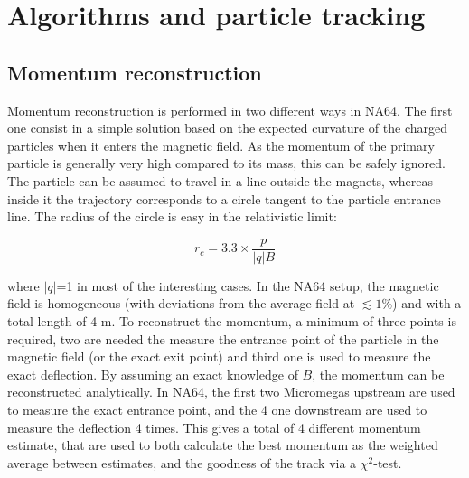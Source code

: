 
\newcommand{\appdird}{appendices/plots/appendixD}

\chapter{Algorithms and particle tracking} %

\label{AppendixD} %



\section{Momentum reconstruction}
\label{appD:sec:mom-reco}

Momentum reconstruction is performed in two different ways in NA64. The first one consist in a simple solution based on the expected curvature of the charged particles when it enters the magnetic field. As the momentum of the primary particle is generally very high compared to its mass, this can be safely ignored. The particle can be assumed to travel in a line outside the magnets, whereas inside it the trajectory corresponds to a circle tangent to the particle entrance line. The radius of the circle is easy in the relativistic limit:

\begin{equation}
  \label{eq:gyro-radius}
  r_c = 3.3 \times \frac{p}{\left|q\right|B}
\end{equation}

where $\left|q\right|$=1 in most of the interesting cases. In the NA64 setup, the magnetic field is homogeneous (with deviations from the average field at $\lesssim 1\%$) and with a total length of 4 \si{\meter}. To reconstruct the momentum, a minimum of three points is required, two are needed the measure the entrance point of the particle in the magnetic field (or the exact exit point) and third one is used to measure the exact deflection. By assuming an exact knowledge of $B$, the momentum can be reconstructed analytically. In NA64, the first two Micromegas upstream are used to measure the exact entrance point, and the 4 one downstream are used to measure the deflection 4 times. This gives a total of 4 different momentum estimate, that are used to both calculate the best momentum as the weighted average between estimates, and the goodness of the track via a $\chi^2$-test.

